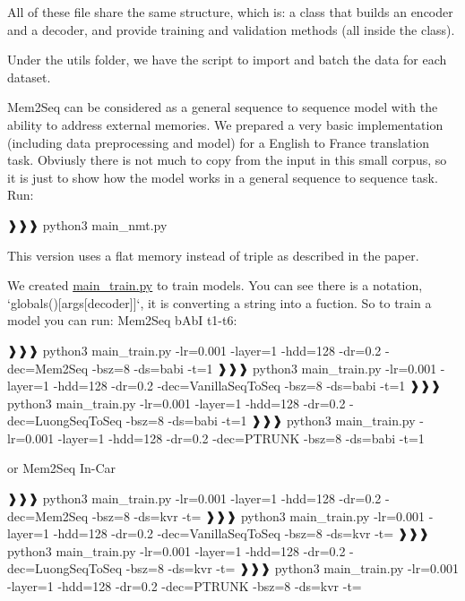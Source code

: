 All of these file share the same structure, which is\+: a class that builds an encoder and a decoder, and provide training and validation methods (all inside the class).

Under the utils folder, we have the script to import and batch the data for each dataset.

Mem2\+Seq can be considered as a general sequence to sequence model with the ability to address external memories. We prepared a very basic implementation (including data preprocessing and model) for a English to France translation task. Obviusly there is not much to copy from the input in this small corpus, so it is just to show how the model works in a general sequence to sequence task. Run\+: 
\begin{DoxyCode}
❱❱❱ python3 main\_nmt.py
\end{DoxyCode}
 This version uses a flat memory instead of triple as described in the paper.

We created {\ttfamily \hyperlink{main__train_8py_source}{main\+\_\+train.\+py}} to train models. You can see there is a notation, `globals()\mbox{[}args\mbox{[}\textquotesingle{}decoder\textquotesingle{}\mbox{]}\mbox{]}`, it is converting a string into a fuction. So to train a model you can run\+: Mem2\+Seq b\+AbI t1-\/t6\+: 
\begin{DoxyCode}
❱❱❱ python3 main\_train.py -lr=0.001 -layer=1 -hdd=128 -dr=0.2 -dec=Mem2Seq -bsz=8 -ds=babi -t=1 
❱❱❱ python3 main\_train.py -lr=0.001 -layer=1 -hdd=128 -dr=0.2 -dec=VanillaSeqToSeq -bsz=8 -ds=babi -t=1
❱❱❱ python3 main\_train.py -lr=0.001 -layer=1 -hdd=128 -dr=0.2 -dec=LuongSeqToSeq -bsz=8 -ds=babi -t=1
❱❱❱ python3 main\_train.py -lr=0.001 -layer=1 -hdd=128 -dr=0.2 -dec=PTRUNK -bsz=8 -ds=babi -t=1
\end{DoxyCode}
 or Mem2\+Seq In-\/\+Car 
\begin{DoxyCode}
❱❱❱ python3 main\_train.py -lr=0.001 -layer=1 -hdd=128 -dr=0.2 -dec=Mem2Seq -bsz=8 -ds=kvr -t=
❱❱❱ python3 main\_train.py -lr=0.001 -layer=1 -hdd=128 -dr=0.2 -dec=VanillaSeqToSeq -bsz=8 -ds=kvr -t=
❱❱❱ python3 main\_train.py -lr=0.001 -layer=1 -hdd=128 -dr=0.2 -dec=LuongSeqToSeq -bsz=8 -ds=kvr -t=
❱❱❱ python3 main\_train.py -lr=0.001 -layer=1 -hdd=128 -dr=0.2 -dec=PTRUNK -bsz=8 -ds=kvr -t=
\end{DoxyCode}


